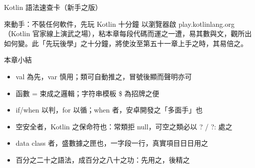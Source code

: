 \begin{center}\small\color{gray}Kotlin 語法速查卡（新手之版）\end{center}

\begin{tcbpractice}{來動手：不裝任何軟件，先玩 Kotlin 十分鐘}
以瀏覽器啟 play.kotlinlang.org（Kotlin 官家線上演武之場），粘本章每段代碼而運之一遭，易其數與文，觀所出如何變。此「先玩後學」之十分鐘，將使汝至第五十一章上手之時，其易倍之。

\end{tcbpractice}

\begin{tcbsummary}{本章小結}
\begin{itemize}
  \item val 為先，var 慎用；類可自動推之，冒號後顯而聲明亦可
  \item 函數 = 束成之邏輯；字符串模板 \$ 為招牌之便
  \item if/when 以判，for 以循；when 者，安卓開發之「多面手」也
  \item 空安全者，Kotlin 之保命符也：常類拒 null，可空之類必以 ? / ?: 處之
  \item data class 者，盛數據之匣也，一字段一行，真實項目日日用之
  \item 百分之二十之語法，成百分之八十之功：先用之，後精之
\end{itemize}

\end{tcbsummary}
